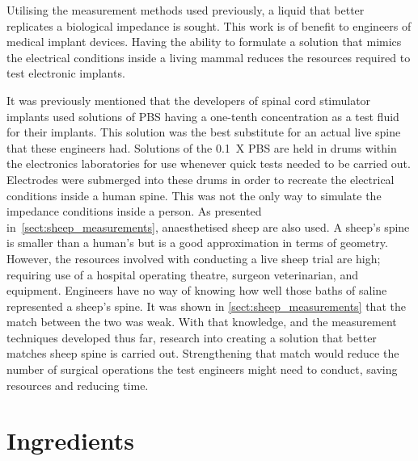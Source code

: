 
Utilising the measurement methods used previously, a liquid that better replicates a biological impedance is sought.
This work is of benefit to engineers of medical implant devices.
Having the ability to formulate a solution that mimics the electrical conditions inside a living mammal reduces the resources required to test electronic implants.

It was previously mentioned that the developers of spinal cord stimulator implants used solutions of PBS having a one-tenth concentration as a test fluid for their implants.
This solution was the best substitute for an actual live spine that these engineers had.
Solutions of the \SI{0.1}{X} PBS are held in drums within the electronics laboratories for use whenever quick tests needed to be carried out.
Electrodes were submerged into these drums in order to recreate the electrical conditions inside a human spine.
This was not the only way to simulate the impedance conditions inside a person.
As presented in~\cref{sect:sheep_measurements}, anaesthetised sheep are also used.
A sheep's spine is smaller than a human's but is a good approximation in terms of geometry.
However, the resources involved with conducting a live sheep trial are high; requiring use of a hospital operating theatre, surgeon veterinarian, and equipment.
Engineers have no way of knowing how well those baths of saline represented a sheep's spine.
It was shown in \cref{sect:sheep_measurements} that the match between the two was weak.
With that knowledge, and the measurement techniques developed thus far, research into creating a solution that better matches sheep spine is carried out.
Strengthening that match would reduce the number of surgical operations the test engineers might need to conduct, saving resources and reducing time.

\section{Ingredients}


